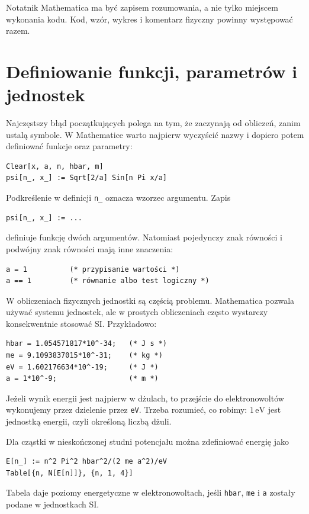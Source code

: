\begin{summarybox}
Notatnik Mathematica ma być zapisem rozumowania, a nie tylko miejscem wykonania kodu. Kod, wzór, wykres i komentarz fizyczny powinny występować razem.
\end{summarybox}

\section{Definiowanie funkcji, parametrów i jednostek}

Najczęstszy błąd początkujących polega na tym, że zaczynają od obliczeń, zanim ustalą symbole. W Mathematice warto najpierw wyczyścić nazwy i dopiero potem definiować funkcje oraz parametry:
\begin{verbatim}
Clear[x, a, n, hbar, m]
psi[n_, x_] := Sqrt[2/a] Sin[n Pi x/a]
\end{verbatim}

Podkreślenie w definicji \texttt{n\_} oznacza wzorzec argumentu. Zapis
\begin{verbatim}
psi[n_, x_] := ...
\end{verbatim}
definiuje funkcję dwóch argumentów. Natomiast pojedynczy znak równości i podwójny znak równości mają inne znaczenia:
\begin{verbatim}
a = 1          (* przypisanie wartości *)
a == 1         (* równanie albo test logiczny *)
\end{verbatim}

W obliczeniach fizycznych jednostki są częścią problemu. Mathematica pozwala używać systemu jednostek, ale w prostych obliczeniach często wystarczy konsekwentnie stosować SI. Przykładowo:
\begin{verbatim}
hbar = 1.054571817*10^-34;   (* J s *)
me = 9.1093837015*10^-31;    (* kg *)
eV = 1.602176634*10^-19;     (* J *)
a = 1*10^-9;                 (* m *)
\end{verbatim}

Jeżeli wynik energii jest najpierw w dżulach, to przejście do elektronowoltów wykonujemy przez dzielenie przez \texttt{eV}. Trzeba rozumieć, co robimy: \(1\,\mathrm{eV}\) jest jednostką energii, czyli określoną liczbą dżuli.

\begin{examplebox}
Dla cząstki w nieskończonej studni potencjału można zdefiniować energię jako
\begin{verbatim}
E[n_] := n^2 Pi^2 hbar^2/(2 me a^2)/eV
Table[{n, N[E[n]]}, {n, 1, 4}]
\end{verbatim}
Tabela daje poziomy energetyczne w elektronowoltach, jeśli \texttt{hbar}, \texttt{me} i \texttt{a} zostały podane w jednostkach SI.
\end{examplebox}

